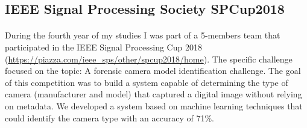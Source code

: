 \documentclass{article}
\begin{document}
\subsection{IEEE Signal Processing Society SPCup2018}
\paragraph{}
During the fourth year of my studies I was part of a 5-members team that participated in the IEEE Signal Processing Cup 2018 (\url{https://piazza.com/ieee_sps/other/spcup2018/home}). The specific challenge focused on the topic: A forensic camera model identification challenge. The goal of this competition was to build a system capable of determining the type of camera (manufacturer and model) that captured a digital image without relying on metadata. We developed a system based on machine learning techniques that could identify the camera type with an accuracy of 71\%.



\end{document}
